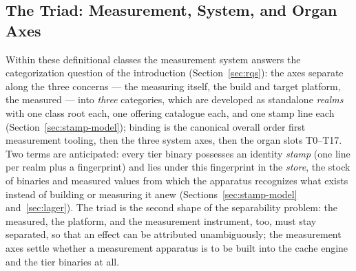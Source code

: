 \begin{nurkurz}
\subsection{The Triad: Measurement, System, and Organ Axes}\label{sec:axis-triad}
Within these definitional classes the measurement system answers the categorization question of the
introduction (Section~\ref{sec:rqs}): the axes separate along the three concerns --- the measuring itself,
the build and target platform, the measured --- into \emph{three} categories, which are developed as
standalone \emph{realms} with one class root each, one offering catalogue each, and one stamp line each
(Section~\ref{sec:stamp-model}); binding is the canonical overall order first measurement tooling, then
the three system axes, then the organ slots T0--T17. Two terms are anticipated: every tier binary
possesses an identity \emph{stamp} (one line per realm plus a fingerprint) and lies under this fingerprint
in the \emph{store}, the stock of binaries and measured values from which the apparatus recognizes what
exists instead of building or measuring it anew (Sections~\ref{sec:stamp-model} and~\ref{sec:lager}). The
triad is the second shape of the separability problem: the measured, the platform, and the measurement
instrument, too, must stay separated, so that an effect can be attributed unambiguously; the measurement
axes settle whether a measurement apparatus is to be built into the cache engine and the tier binaries at
all.
\end{nurkurz}

